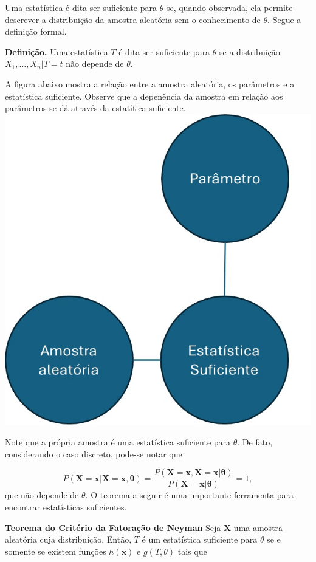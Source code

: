 \documentclass[
  letterpaper,
  DIV=11,
  numbers=noendperiod]{scrreprt}
\begin{document}
Uma estatística é dita ser suficiente para \(\theta\) se, quando
observada, ela permite descrever a distribuição da amostra aleatória sem
o conhecimento de \(\theta\). Segue a definição formal.

\textbf{Definição.} Uma estatística \(T\) é dita ser suficiente para
\(\theta\) se a distribuição \(X_1,\ldots,X_n|T=t\) não depende de
\(\theta\).

A figura abaixo mostra a relação entre a amostra aleatória, os
parâmetros e a estatística suficiente. Observe que a depenência da
amostra em relação aos parâmetros se dá através da estatítica
suficiente. \includegraphics{fig_stat_suficiente.jpg}

Note que a própria amostra é uma estatística suficiente para \(\theta\).
De fato, considerando o caso discreto, pode-se notar que

\[P(\textbf{X}=\textbf{x}|\textbf{X}=\textbf{x},\boldsymbol{\theta})=\frac{P(\textbf{X}=\textbf{x},\textbf{X}=\textbf{x}|\boldsymbol{\theta})}{P(\textbf{X}=\textbf{x}|\boldsymbol{\theta})}=1,\]
que não depende de \(\theta\). O teorema a seguir é uma importante
ferramenta para encontrar estatísticas suficientes.

\textbf{Teorema do Critério da Fatoração de Neyman} Seja \(\textbf{X}\)
uma amostra aleatória cuja distribuição. Então, \(T\) é um estatística
suficiente para \(\theta\) se e somente se existem funções
\(h(\textbf{x})\) e \(g(T,\theta)\) tais que
\end{document}
